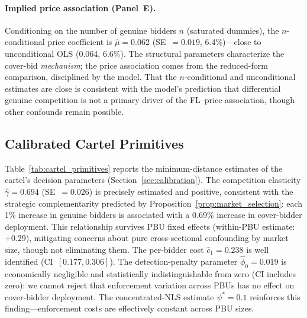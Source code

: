 \paragraph{Implied price association (Panel~E).}
Conditioning on the number of genuine bidders $n$
(saturated dummies), the $n$-conditional price coefficient is
$\hat{\mu} = 0.062$ (SE~$= 0.019$, 6.4\%)---close to
unconditional OLS (0.064, 6.6\%). The structural parameters characterize the
cover-bid \emph{mechanism}; the price association comes from the
reduced-form comparison, disciplined by the model. That the
$n$-conditional and unconditional estimates are close is consistent
with the model's prediction that differential genuine competition
is not a primary driver of the FL--price association, though other
confounds remain possible.




\subsection{Calibrated Cartel Primitives}
\label{sec:results_calibration}



Table~\ref{tab:cartel_primitives} reports the
minimum-distance estimates of the cartel's decision parameters
(Section~\ref{sec:calibration}). The competition elasticity
$\hat{\gamma} = 0.694$ (SE~$= 0.026$) is precisely estimated
and positive, consistent with the strategic complementarity
predicted by Proposition~\ref{prop:market_selection}: each 1\%
increase in genuine bidders is associated with a 0.69\% increase in
cover-bidder deployment. This relationship survives PBU fixed
effects (within-PBU estimate: $+0.29$), mitigating concerns about
pure cross-sectional confounding by market size, though not
eliminating them.
The per-bidder cost $\hat{c}_1 = 0.238$ is well identified
(CI~$[0.177, 0.306]$). The detection-penalty parameter
$\hat{\phi}_0 = 0.019$ is economically negligible and
statistically indistinguishable from zero (CI includes zero):
we cannot reject that enforcement variation across PBUs has no
effect on cover-bidder deployment. The concentrated-NLS estimate
$\psi^* = 0.1$ reinforces this finding---enforcement costs are
effectively constant across PBU sizes.

